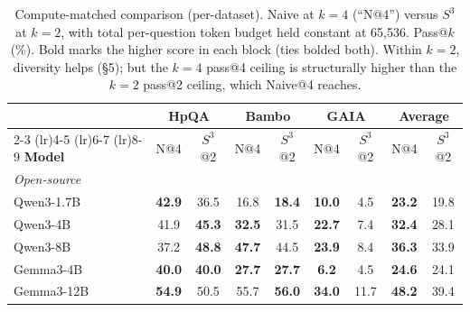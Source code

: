 \begin{table}[t]
\centering
\small
\setlength{\tabcolsep}{4pt}
\renewcommand{\arraystretch}{1.05}
\begin{tabular}{l *{6}{c} *{2}{c}}
\toprule
& \multicolumn{2}{c}{HpQA} & \multicolumn{2}{c}{Bambo}
& \multicolumn{2}{c}{GAIA} & \multicolumn{2}{c}{Average} \\
\cmidrule(lr){2-3} \cmidrule(lr){4-5} \cmidrule(lr){6-7} \cmidrule(lr){8-9}
\textbf{Model}
& N@4 & $S^3$@2 & N@4 & $S^3$@2 & N@4 & $S^3$@2
& N@4 & $S^3$@2 \\
\midrule
\multicolumn{9}{l}{\textit{Open-source}} \\
Qwen3-1.7B
& \cellcolor{naivetint}\textbf{42.9} & \cellcolor{s3tint}36.5
& \cellcolor{naivetint}16.8 & \cellcolor{s3tint}\textbf{18.4}
& \cellcolor{naivetint}\textbf{10.0} & \cellcolor{s3tint}4.5
& \cellcolor{naivetint}\textbf{23.2} & \cellcolor{s3tint}19.8 \\
Qwen3-4B
& \cellcolor{naivetint}41.9 & \cellcolor{s3tint}\textbf{45.3}
& \cellcolor{naivetint}\textbf{32.5} & \cellcolor{s3tint}31.5
& \cellcolor{naivetint}\textbf{22.7} & \cellcolor{s3tint}7.4
& \cellcolor{naivetint}\textbf{32.4} & \cellcolor{s3tint}28.1 \\
Qwen3-8B
& \cellcolor{naivetint}37.2 & \cellcolor{s3tint}\textbf{48.8}
& \cellcolor{naivetint}\textbf{47.7} & \cellcolor{s3tint}44.5
& \cellcolor{naivetint}\textbf{23.9} & \cellcolor{s3tint}8.4
& \cellcolor{naivetint}\textbf{36.3} & \cellcolor{s3tint}33.9 \\
Gemma3-4B
& \cellcolor{naivetint}\textbf{40.0} & \cellcolor{s3tint}\textbf{40.0}
& \cellcolor{naivetint}\textbf{27.7} & \cellcolor{s3tint}\textbf{27.7}
& \cellcolor{naivetint}\textbf{6.2} & \cellcolor{s3tint}4.5
& \cellcolor{naivetint}\textbf{24.6} & \cellcolor{s3tint}24.1 \\
Gemma3-12B
& \cellcolor{naivetint}\textbf{54.9} & \cellcolor{s3tint}50.5
& \cellcolor{naivetint}55.7 & \cellcolor{s3tint}\textbf{56.0}
& \cellcolor{naivetint}\textbf{34.0} & \cellcolor{s3tint}11.7
& \cellcolor{naivetint}\textbf{48.2} & \cellcolor{s3tint}39.4 \\
\bottomrule
\end{tabular}
\caption{Compute-matched comparison (per-dataset). Naive at $k{=}4$
(``N@4'') versus $S^3$ at $k{=}2$, with total per-question token
budget held constant at 65{,}536. Pass@$k$ (\%). Bold marks the
higher score in each block (ties bolded both). Within $k{=}2$,
diversity helps (\S5); but the $k{=}4$ pass@4 ceiling is structurally
higher than the $k{=}2$ pass@2 ceiling, which Naive@4 reaches.}
\label{tab:app-compute_matched}
\end{table}

